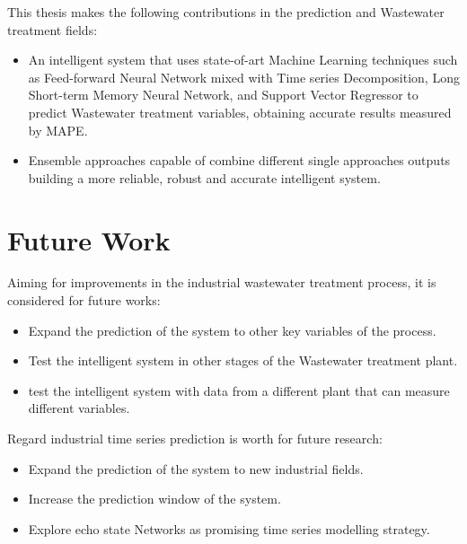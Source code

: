This thesis makes the following contributions in the prediction and Wastewater  treatment fields:
\begin{itemize}
    \item An intelligent system that uses state-of-art Machine Learning techniques such as Feed-forward Neural Network mixed with Time series Decomposition, Long Short-term Memory Neural Network, and Support Vector Regressor to predict Wastewater treatment variables, obtaining accurate results measured by MAPE.
    \item Ensemble approaches capable of combine different single approaches outputs building a more reliable, robust and accurate intelligent system.  
\end{itemize}
 

\section{Future Work}
Aiming for improvements in the industrial wastewater treatment process, it is considered for future works:
\begin{itemize}
    \item Expand the prediction of the system to other key variables of the process.
    \item Test the intelligent system in other stages of the Wastewater treatment plant.
    \item test the intelligent system with data from a different plant that can measure different variables.
\end{itemize}
Regard industrial time series prediction is worth for future research:
\begin{itemize}
    \item Expand the prediction of the system to new industrial fields.
    \item Increase the prediction window of the system.
    \item Explore echo state Networks as promising time series modelling strategy.
\end{itemize}

